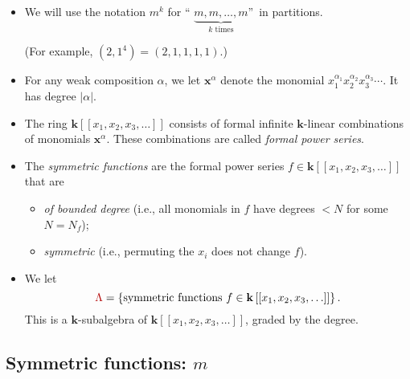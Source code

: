 \documentclass[numbers=enddot,12pt,final,onecolumn,notitlepage]{scrartcl}%
\newcommand{\defn}[1]{{\color{darkred}\emph{#1}}}
\newcommand{\defnm}[1]{{\color{darkred} #1}}
\newcommand{\0}{\phantom{c}}
\begin{document}
\begin{itemize}
\item We will use the notation \defn{$m^{k}$} for \textquotedblleft%
$\underbrace{m,m,\ldots,m}_{k\text{ times}}$\textquotedblright\ in partitions.

(For example, $\left(  2,1^{4}\right)  =\left(  2,1,1,1,1\right)  $.)

\item For any weak composition $\alpha$, we let \defn{$\mathbf{x}^{\alpha}$}
denote the monomial $x_{1}^{\alpha_{1}}x_{2}^{\alpha_{2}}x_{3}^{\alpha_{3}%
}\cdots$. It has degree $\left\vert \alpha\right\vert $.

\item The ring
\defn{$\mathbf{k}\left[  \left[  x_{1},x_{2},x_{3},\ldots\right]
\right]  $} consists of formal infinite $\mathbf{k}$-linear combinations of
monomials $\mathbf{x}^{\alpha}$. These combinations are called \defn{formal power series}.

\item The \defn{symmetric functions} are the formal power series
$f\in\mathbf{k}\left[  \left[  x_{1},x_{2},x_{3},\ldots\right]  \right]  $
that are

\begin{itemize}
\item \defn{of bounded degree} (i.e., all monomials in $f$ have degrees $<N$
for some $N=N_{f}$);

\item \defn{symmetric} (i.e., permuting the $x_{i}$ does not change $f$).
\end{itemize}

\item We let
\[
\defnm{\Lambda}=\left\{  \text{symmetric functions }f\in\mathbf{k}\left[
\left[  x_{1},x_{2},x_{3},\ldots\right]  \right]  \right\}  .
\]
This is a $\mathbf{k}$-subalgebra of $\mathbf{k}\left[  \left[  x_{1}%
,x_{2},x_{3},\ldots\right]  \right]  $, graded by the degree.
\end{itemize}

\subsection{Symmetric functions: $m$}
\end{document}
